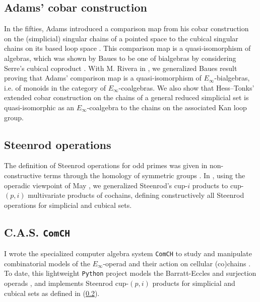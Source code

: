 \subsection{Adams' cobar construction}

In the fifties, Adams introduced a comparison map from his cobar construction on the (simplicial) singular chains of a pointed space to the cubical singular chains on its based loop space \cite{adams1956cobar}.
This comparison map is a quasi-isomorphism of algebras, which was shown by Baues to be one of bialgebras by considering Serre's cubical coproduct \cite{baues1998hopf}.
With M. Rivera in \cite{medina2021cobar}, we generalized Baues result proving that Adams' comparison map is a quasi-isomorphism of $E_{\infty}$-bialgebras, i.e. of monoids in the category of $E_{\infty}$-coalgebras.
We also show that Hess--Tonks' extended cobar construction \cite{hess2010cobar} on the chains of a general reduced simplicial set is quasi-isomorphic as an $E_{\infty}$-coalgebra to the chains on the associated Kan loop group.

\subsection{Steenrod operations} \label{ss:may steenrod}

The definition of Steenrod operations for odd primes was given in non-constructive terms through the homology of symmetric groups \cite{steenrod1952reduced, steenrod1962cohomology}.
In \cite{medina2021maysteenrod}, using the operadic viewpoint of May \cite{may1970general}, we generalized Steenrod's cup-$i$ products to cup-$(p,i)$ multivariate products of cochains, defining constructively all Steenrod operations for simplicial and cubical sets.

\subsection{C.A.S. \texttt{ComCH}}

I wrote the specialized computer algebra system \texttt{ComCH} to study and manipulate combinatorial models of the $E_\infty$-operad and their action on cellular (co)chains \cite{medina2021computer}.
To date, this lightweight \texttt{Python} project models the Barratt-Eccles and surjection operads \cite{mcclure2003multivariable,berger2004combinatorial}, and implements Steenrod cup-$(p,i)$ products for simplicial and cubical sets as defined in \cite{medina2021maysteenrod} (\cref{ss:may steenrod}).

